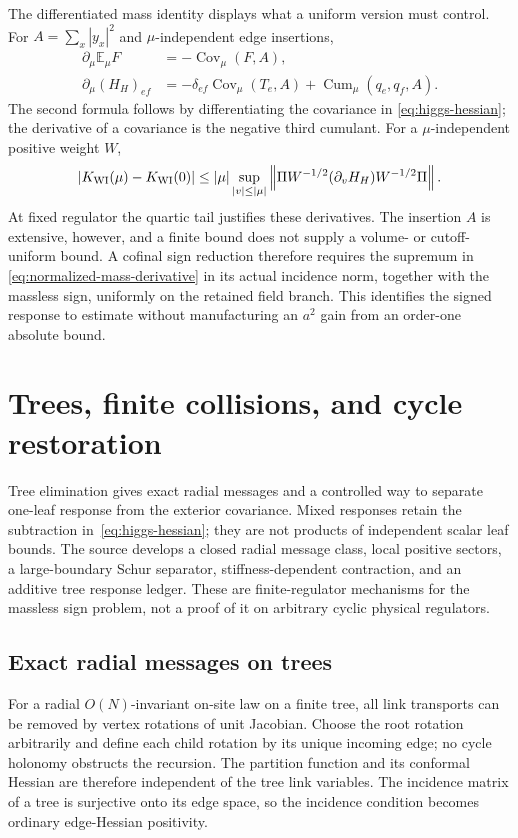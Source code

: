 \documentclass[11pt,a4paper,oneside]{book}
\theoremstyle{plain}
\theoremstyle{definition}
\theoremstyle{remark}
\newcommand{\E}{\mathbb E}
\newcommand{\Cov}{\operatorname{Cov}}
\newcommand{\Cum}{\operatorname{Cum}}
\newcommand{\norm}[1]{\left\lVert#1\right\rVert}
\newcommand{\src}[2]{\cite{#1}}
\begin{document}
The differentiated mass identity displays what a uniform version must
control.  For $A=\sum_x|y_x|^2$ and $\mu$-independent edge insertions,
\begin{align}
 \partial_\mu\E_\mu F&=-\Cov_\mu(F,A),\\
 \partial_\mu(H_H)_{ef}
 &=-\delta_{ef}\Cov_\mu(T_e,A)
                  +\Cum_\mu(q_e,q_f,A).
 \label{eq:mass-hessian-response}
\end{align}
The second formula follows by differentiating the covariance in
\eqref{eq:higgs-hessian}; the derivative of a covariance is the negative
third cumulant.  For a $\mu$-independent positive weight $W$,
\begin{equation}
 |K_{\rm WI}(\mu)-K_{\rm WI}(0)|
 \le |\mu|\sup_{|v|\le|\mu|}
 \norm{\Pi W^{-1/2}(\partial_vH_H)W^{-1/2}\Pi}.
 \label{eq:normalized-mass-derivative}
\end{equation}
At fixed regulator the quartic tail justifies these derivatives.  The
insertion $A$ is extensive, however, and a finite bound does not supply a
volume- or cutoff-uniform bound.  A cofinal sign reduction therefore
requires the supremum in \eqref{eq:normalized-mass-derivative} in its
actual incidence norm, together with the massless sign, uniformly on the
retained field branch.  This identifies the signed response to estimate
without manufacturing an $a^2$ gain from an order-one absolute bound.
\src{R17}{lem:v17v100-mass-derivative,thm:v17v100-massless-expansion}

\section{Trees, finite collisions, and cycle restoration}
Tree elimination gives exact radial messages and a controlled way to separate one-leaf response from the exterior covariance. Mixed responses retain the subtraction in~\eqref{eq:higgs-hessian}; they are not products of independent scalar leaf bounds. The source develops a closed radial message class, local positive sectors, a large-boundary Schur separator, stiffness-dependent contraction, and an additive tree response ledger. These are finite-regulator mechanisms for the massless sign problem, not a proof of it on arbitrary cyclic physical regulators. \cite{R18}

\subsection{Exact radial messages on trees}
For a radial $O(N)$-invariant on-site law on a finite tree, all link transports can be removed by vertex rotations of unit Jacobian. Choose the root rotation arbitrarily and define each child rotation by its unique incoming edge; no cycle holonomy obstructs the recursion. The partition function and its conformal Hessian are therefore independent of the tree link variables. The incidence matrix of a tree is surjective onto its edge space, so the incidence condition becomes ordinary edge-Hessian positivity. \src{R18}{thm:v18v1-gauge-erasure,thm:v18v1-incidence-surjective}
\end{document}
